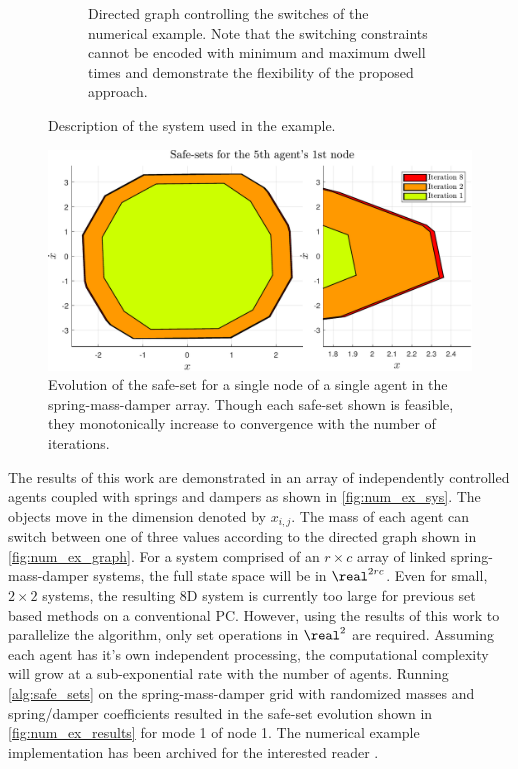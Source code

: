 \begin{figure}
\begin{subfigure}[c]{0.475\columnwidth}
		\caption{Directed graph controlling the switches of the numerical example. Note that the switching constraints cannot be encoded with minimum and maximum dwell times and demonstrate the flexibility of the proposed approach.}%
		\label{fig:num_ex_graph}%
	\end{subfigure}%
	\caption{Description of the system used in the example.}%
\end{figure}

\begin{figure}[t]
\centering
\includegraphics[width=\columnwidth]{./figures/num_ex_results}
\caption{Evolution of the safe-set for a single node of a single agent in the spring-mass-damper array. Though each safe-set shown is feasible, they monotonically increase to convergence with the number of iterations.}
\label{fig:num_ex_results}
\end{figure}

The results of this work are demonstrated in an array of independently controlled agents coupled with springs and dampers as shown in \autoref{fig:num_ex_sys}. The objects move in the dimension denoted by $x_{i,j}$. The mass of each agent can switch between one of three values according to the directed graph shown in \autoref{fig:num_ex_graph}. For a system comprised of an $r\times c$ array of linked spring-mass-damper systems, the full state space will be in $\real^{2rc}$. Even for small, $2\times 2$ systems, the resulting 8D system is currently too large for previous set based methods on a conventional PC. However, using the results of this work to parallelize the algorithm, only set operations in $\real^2$ are required. Assuming each agent has it's own independent processing, the computational complexity will grow at a sub-exponential rate with the number of agents. Running \autoref{alg:safe_sets} on the spring-mass-damper grid with randomized masses and spring/damper coefficients resulted in the safe-set evolution shown in \autoref{fig:num_ex_results} for mode 1 of node 1. The numerical example implementation has been archived for the interested reader \cite{PaperSoftware}. 